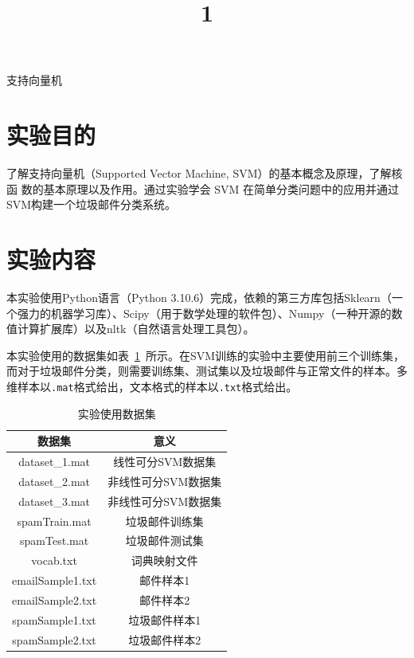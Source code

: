 \documentclass{SEU-AI-Report}
\begin{document}
\title{1}{支持向量机}

\section{实验目的}
了解支持向量机（Supported Vector Machine, SVM）的基本概念及原理，了解核函
数的基本原理以及作用。通过实验学会 SVM 在简单分类问题中的应用并通过
SVM构建一个垃圾邮件分类系统。

\section{实验内容}
本实验使用Python语言（Python 3.10.6）完成，依赖的第三方库包括Sklearn（一个强力的机器学习库）、Scipy（用于数学处理的软件包）、Numpy（一种开源的数值计算扩展库）以及nltk（自然语言处理工具包）。

本实验使用的数据集如表~\ref{tab:dataset}~所示。在SVM训练的实验中主要使用前三个训练集，而对于垃圾邮件分类，则需要训练集、测试集以及垃圾邮件与正常文件的样本。多维样本以\texttt{.mat}格式给出，文本格式的样本以\texttt{.txt}格式给出。
\begin{table}[htbp]
    \centering
    
    
    \begin{tabular}{cc}
        \toprule
        数据集 & 意义 \\
        \midrule
        dataset\_1.mat		& 线性可分SVM数据集\\
        dataset\_2.mat		& 非线性可分SVM数据集\\
        dataset\_3.mat		& 非线性可分SVM数据集\\
        spamTrain.mat		& 垃圾邮件训练集\\
        spamTest.mat		& 垃圾邮件测试集\\
        vocab.txt			& 词典映射文件\\
        emailSample1.txt	& 邮件样本1\\
        emailSample2.txt	& 邮件样本2\\
        spamSample1.txt		& 垃圾邮件样本1\\
        spamSample2.txt		& 垃圾邮件样本2\\
        \bottomrule

    \end{tabular}
    \caption{实验使用数据集}
    \label{tab:dataset}
\end{table}
\end{document}
